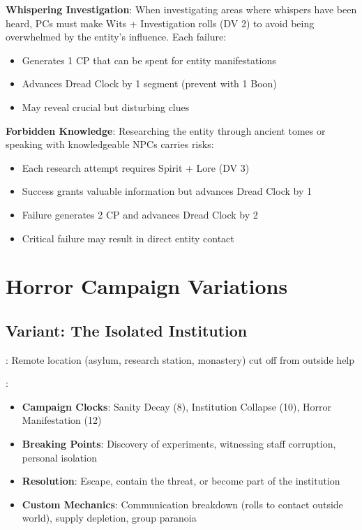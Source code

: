 \documentclass[11pt]{article}
\begin{document}
\begin{mdframed}[backgroundcolor=sanitybg]
\textbf{Whispering Investigation}: When investigating areas where whispers have been heard, PCs must make Wits + Investigation rolls (DV 2) to avoid being overwhelmed by the entity's influence. Each failure:
\begin{itemize}[leftmargin=*]
\item Generates 1 CP that can be spent for entity manifestations
\item Advances Dread Clock by 1 segment (prevent with 1 Boon)
\item May reveal crucial but disturbing clues
\end{itemize}

\textbf{Forbidden Knowledge}: Researching the entity through ancient tomes or speaking with knowledgeable NPCs carries risks:
\begin{itemize}[leftmargin=*]
\item Each research attempt requires Spirit + Lore (DV 3)
\item Success grants valuable information but advances Dread Clock by 1
\item Failure generates 2 CP and advances Dread Clock by 2
\item Critical failure may result in direct entity contact
\end{itemize}
\end{mdframed}

\section*{Horror Campaign Variations}

\subsection*{Variant: The Isolated Institution}

\begin{description}[leftmargin=*]
\item[Setting]: Remote location (asylum, research station, monastery) cut off from outside help
\item[Key Elements]:
\begin{itemize}[leftmargin=*]
\item \textbf{Campaign Clocks}: Sanity Decay (8), Institution Collapse (10), Horror Manifestation (12)
\item \textbf{Breaking Points}: Discovery of experiments, witnessing staff corruption, personal isolation
\item \textbf{Resolution}: Escape, contain the threat, or become part of the institution
\item \textbf{Custom Mechanics}: Communication breakdown (rolls to contact outside world), supply depletion, group paranoia
\end{itemize}
\end{description}
\end{document}
